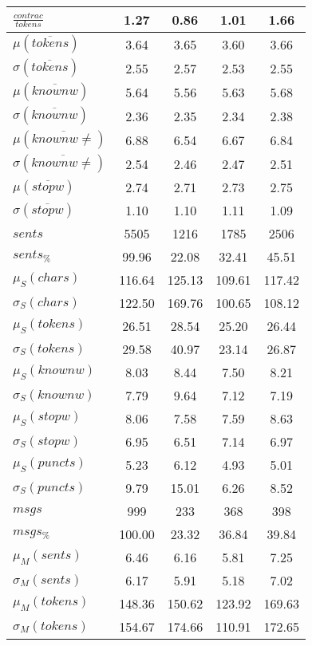 \begin{table}[h!]
\begin{center}
\begin{tabular}{| l || c | c | c | c |}
$\frac{contrac}{tokens}$ & 1.27  & 0.86  & 1.01  & 1.66 \\\hline\hline
$\mu(\overline{tokens})$ & 3.64  & 3.65  & 3.60  & 3.66 \\
$\sigma(\overline{tokens})$ & 2.55  & 2.57  & 2.53  & 2.55 \\\hline
$\mu(\overline{knownw})$ & 5.64  & 5.56  & 5.63  & 5.68 \\
$\sigma(\overline{knownw})$ & 2.36  & 2.35  & 2.34  & 2.38 \\\hline
$\mu(\overline{knownw \neq})$ & 6.88  & 6.54  & 6.67  & 6.84 \\
$\sigma(\overline{knownw \neq})$ & 2.54  & 2.46  & 2.47  & 2.51 \\\hline
$\mu(\overline{stopw})$ & 2.74  & 2.71  & 2.73  & 2.75 \\
$\sigma(\overline{stopw})$ & 1.10  & 1.10  & 1.11  & 1.09 \\\hline\hline
$sents$ & 5505  & 1216  & 1785  & 2506 \\
$sents_{\%}$ & 99.96  & 22.08  & 32.41  & 45.51 \\\hline
$\mu_S(chars)$ & 116.64  & 125.13  & 109.61  & 117.42 \\
$\sigma_S(chars)$ & 122.50  & 169.76  & 100.65  & 108.12 \\\hline
$\mu_S(tokens)$ & 26.51  & 28.54  & 25.20  & 26.44 \\
$\sigma_S(tokens)$ & 29.58  & 40.97  & 23.14  & 26.87 \\\hline
$\mu_S(knownw)$ & 8.03  & 8.44  & 7.50  & 8.21 \\
$\sigma_S(knownw)$ & 7.79  & 9.64  & 7.12  & 7.19 \\\hline
$\mu_S(stopw)$ & 8.06  & 7.58  & 7.59  & 8.63 \\
$\sigma_S(stopw)$ & 6.95  & 6.51  & 7.14  & 6.97 \\\hline
$\mu_S(puncts)$ & 5.23  & 6.12  & 4.93  & 5.01 \\
$\sigma_S(puncts)$ & 9.79  & 15.01  & 6.26  & 8.52 \\\hline\hline
$msgs$ & 999  & 233  & 368  & 398 \\
$msgs_{\%}$ & 100.00  & 23.32  & 36.84  & 39.84 \\\hline
$\mu_M(sents)$ & 6.46  & 6.16  & 5.81  & 7.25 \\
$\sigma_M(sents)$ & 6.17  & 5.91  & 5.18  & 7.02 \\\hline
$\mu_M(tokens)$ & 148.36  & 150.62  & 123.92  & 169.63 \\
$\sigma_M(tokens)$ & 154.67  & 174.66  & 110.91  & 172.65 \\\hline

\end{tabular}
\end{center}
\end{table}
